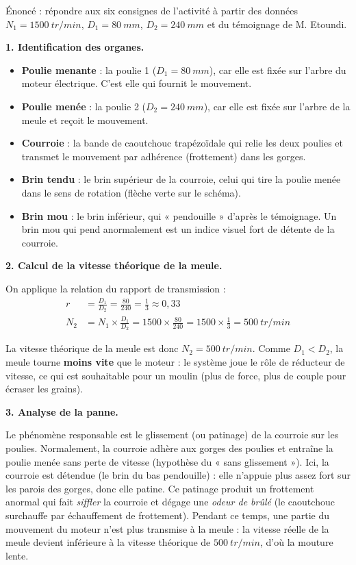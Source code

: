 \documentclass[11pt]{article}
\newcommand{\cle}[1]{{\popxbold\color{popdark}#1}}
\newcounter{popsec}
\newcounter{popsub}
\newcommand{\courssub}[1]{%
  \stepcounter{popsub}%
  \par\vspace{9pt}\noindent{\popxbold\fontsize{11.5}{13}\selectfont\color{popink}{\color{poporange}\thepopsec.\thepopsub}\hspace{6pt}#1}\par\nopagebreak\vspace{4pt}
}
\begin{document}
\courssub{Démarche et corrigé commenté}

\begin{exoresolu}
Énoncé : répondre aux six consignes de l'activité à partir des données $N_1 = \SI{1500}{tr/min}$, $D_1 = \SI{80}{mm}$, $D_2 = \SI{240}{mm}$ et du témoignage de M. Etoundi.

\tcblower

\textbf{1. Identification des organes.}

\begin{itemize}
\item \textbf{Poulie menante} : la poulie 1 ($D_1 = \SI{80}{mm}$), car elle est fixée sur l'arbre du moteur électrique. C'est elle qui fournit le mouvement.
\item \textbf{Poulie menée} : la poulie 2 ($D_2 = \SI{240}{mm}$), car elle est fixée sur l'arbre de la meule et reçoit le mouvement.
\item \textbf{Courroie} : la bande de caoutchouc trapézoïdale qui relie les deux poulies et transmet le mouvement par adhérence (frottement) dans les gorges.
\item \textbf{Brin tendu} : le brin supérieur de la courroie, celui qui tire la poulie menée dans le sens de rotation (flèche verte sur le schéma).
\item \textbf{Brin mou} : le brin inférieur, qui « pendouille » d'après le témoignage. Un brin mou qui pend anormalement est un indice visuel fort de détente de la courroie.
\end{itemize}

\textbf{2. Calcul de la vitesse théorique de la meule.}

On applique la relation du rapport de transmission :
\begin{align*}
r &= \frac{D_1}{D_2} = \frac{80}{240} = \frac{1}{3} \approx 0{,}33 \\
N_2 &= N_1 \times \frac{D_1}{D_2} = 1500 \times \frac{80}{240} = 1500 \times \frac{1}{3} = \SI{500}{tr/min}
\end{align*}

La vitesse théorique de la meule est donc $N_2 = \SI{500}{tr/min}$. Comme $D_1 < D_2$, la meule tourne \textbf{moins vite} que le moteur : le système joue le rôle de réducteur de vitesse, ce qui est souhaitable pour un moulin (plus de force, plus de couple pour écraser les grains).

\textbf{3. Analyse de la panne.}

Le phénomène responsable est le \cle{glissement} (ou patinage) de la courroie sur les poulies. Normalement, la courroie adhère aux gorges des poulies et entraîne la poulie menée sans perte de vitesse (hypothèse du « sans glissement »). Ici, la courroie est détendue (le brin du bas pendouille) : elle n'appuie plus assez fort sur les parois des gorges, donc elle patine. Ce patinage produit un frottement anormal qui fait \emph{siffler} la courroie et dégage une \emph{odeur de brûlé} (le caoutchouc surchauffe par échauffement de frottement). Pendant ce temps, une partie du mouvement du moteur n'est plus transmise à la meule : la vitesse réelle de la meule devient inférieure à la vitesse théorique de $\SI{500}{tr/min}$, d'où la mouture lente.


\end{exoresolu}
\end{document}
